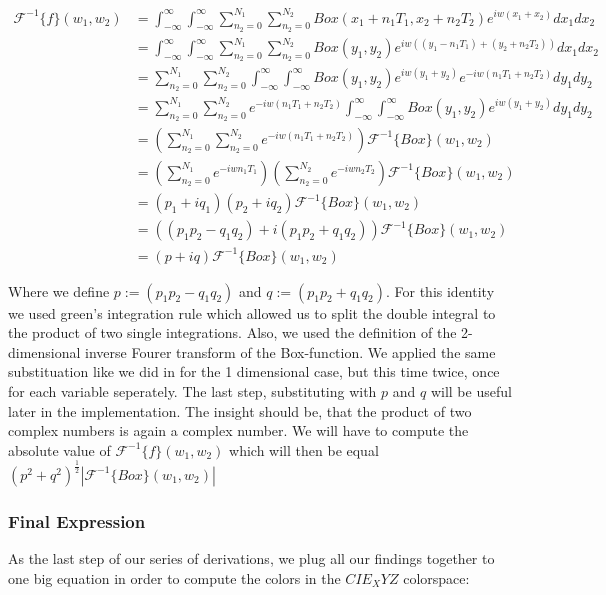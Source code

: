 \begin{align*}
\mathcal{F}^{-1}\{f\}(w_1,w_2)
& = \int_{-\infty}^{\infty}\int_{-\infty}^{\infty} \sum_{n_2=0}^{N_1} \sum_{n_2=0}^{N_2} Box(x_1 + n_1 T_1, x_2 + n_2 T_2) e^{iw(x_1 + x_2)}dx_1 dx_2 \\
& = \int_{-\infty}^{\infty}\int_{-\infty}^{\infty} \sum_{n_2=0}^{N_1} \sum_{n_2=0}^{N_2} Box(y_1, y_2) e^{iw((y_1 - n_1 T_1) + (y_2 + n_2 T_2))}dx_1 dx_2 \\
& =\sum_{n_2=0}^{N_1} \sum_{n_2=0}^{N_2} \int_{-\infty}^{\infty}\int_{-\infty}^{\infty} Box(y_1, y_2) e^{iw(y_1 + y_2)} e^{-iw(n_1 T_1 + n_2 T_2)}dy_1 dy_2 \\
& =\sum_{n_2=0}^{N_1} \sum_{n_2=0}^{N_2} e^{-iw(n_1 T_1 + n_2 T_2)} \int_{-\infty}^{\infty}\int_{-\infty}^{\infty} Box(y_1, y_2) e^{iw(y_1 + y_2)} dy_1 dy_2 \\
& =\left(\sum_{n_2=0}^{N_1} \sum_{n_2=0}^{N_2} e^{-iw(n_1 T_1 + n_2 T_2)}\right) \mathcal{F}^{-1}\{Box\}(w_1,w_2) \\
& =\left(\sum_{n_2=0}^{N_1} e^{-iw n_1 T_1}\right) \left(\sum_{n_2=0}^{N_2} e^{-iw n_2 T_2}\right) \mathcal{F}^{-1}\{Box\}(w_1,w_2) \\
& =(p_1 + i q_1)(p_2 + i q_2) \mathcal{F}^{-1}\{Box\}(w_1,w_2) \\
& =((p_1 p_2 - q_1 q_2) + i(p_1 p_2 + q_1 q_2)) \mathcal{F}^{-1}\{Box\}(w_1,w_2) \\
& =(p + iq) \mathcal{F}^{-1}\{Box\}(w_1,w_2)
\end{align*}

Where we define $p := (p_1 p_2 - q_1 q_2) $ and $q := (p_1 p_2 + q_1 q_2)$. For this identity we used green's integration rule which allowed us to split the double integral to the product of two single integrations. Also, we used the definition of the 2-dimensional inverse Fourer transform of the Box-function. We applied the same substituation like we did in for the 1 dimensional case, but this time twice, once for each variable seperately. The last step, substituting with $p$ and $q$ will be useful later in the implementation. The insight should be, that the product of two complex numbers is again a complex number. We will have to compute the absolute value of $\mathcal{F}^{-1}\{f\}(w_1,w_2)$ which will then be equal $(p^2 + q^2)^{\frac{1}{2}}\left|\mathcal{F}^{-1}\{Box\}(w_1,w_2)\right|$

\subsubsection{Final Expression}
As the last step of our series of derivations, we plug all our findings together to one big equation in order to compute the colors in the $CIE_XYZ$ colorspace:

